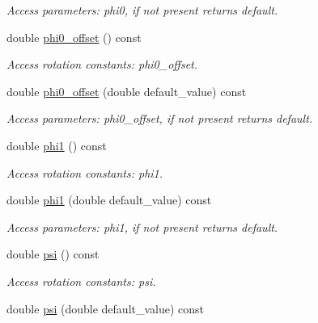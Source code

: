 \begin{DoxyCompactItemize}
\begin{DoxyCompactList}\small\item\em Access parameters: phi0, if not present returns default. \item\end{DoxyCompactList}\item 
double \hyperlink{struct_d_d4hep_1_1_x_m_l_1_1_dimension_ac4819fb6e7e65e77f55a86058ead1bad}{phi0\_\-offset} () const 
\begin{DoxyCompactList}\small\item\em Access rotation constants: phi0\_\-offset. \item\end{DoxyCompactList}\item 
double \hyperlink{struct_d_d4hep_1_1_x_m_l_1_1_dimension_af9fe8ef5b72222a849c0b16494c22b30}{phi0\_\-offset} (double default\_\-value) const 
\begin{DoxyCompactList}\small\item\em Access parameters: phi0\_\-offset, if not present returns default. \item\end{DoxyCompactList}\item 
double \hyperlink{struct_d_d4hep_1_1_x_m_l_1_1_dimension_a96357d042353b360e9b8778f8bd237cd}{phi1} () const 
\begin{DoxyCompactList}\small\item\em Access rotation constants: phi1. \item\end{DoxyCompactList}\item 
double \hyperlink{struct_d_d4hep_1_1_x_m_l_1_1_dimension_a0cc5f00cea8888e2f5f774d2172c82ff}{phi1} (double default\_\-value) const 
\begin{DoxyCompactList}\small\item\em Access parameters: phi1, if not present returns default. \item\end{DoxyCompactList}\item 
double \hyperlink{struct_d_d4hep_1_1_x_m_l_1_1_dimension_aef9defadec0d5575c064ca3d6671ae66}{psi} () const 
\begin{DoxyCompactList}\small\item\em Access rotation constants: psi. \item\end{DoxyCompactList}\item 
double \hyperlink{struct_d_d4hep_1_1_x_m_l_1_1_dimension_a7b877cfeab02cccb9098c24302ff1dd3}{psi} (double default\_\-value) const 

\end{DoxyCompactItemize}
